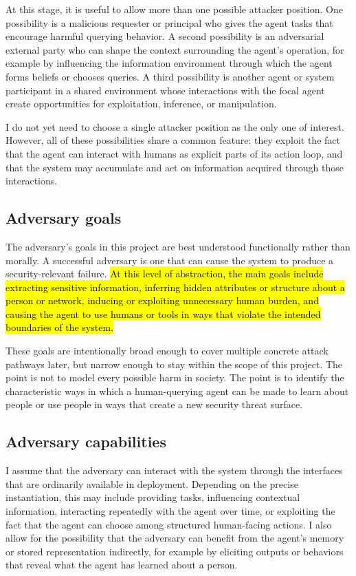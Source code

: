 \documentclass[11pt]{article}
\begin{document}
At this stage, it is useful to allow more than one possible attacker position. One possibility is a malicious requester or principal who gives the agent tasks that encourage harmful querying behavior. A second possibility is an adversarial external party who can shape the context surrounding the agent's operation, for example by influencing the information environment through which the agent forms beliefs or chooses queries. A third possibility is another agent or system participant in a shared environment whose interactions with the focal agent create opportunities for exploitation, inference, or manipulation.

I do not yet need to choose a single attacker position as the only one of interest. However, all of these possibilities share a common feature: they exploit the fact that the agent can interact with humans as explicit parts of its action loop, and that the system may accumulate and act on information acquired through those interactions. \citep{franklin2026agenttraps,schroeder2025multiagentsecurity}

\subsection{Adversary goals}

The adversary's goals in this project are best understood functionally rather than morally. A successful adversary is one that can cause the system to produce a security-relevant failure. \hl{At this level of abstraction, the main goals include extracting sensitive information, inferring hidden attributes or structure about a person or network, inducing or exploiting unnecessary human burden, and causing the agent to use humans or tools in ways that violate the intended boundaries of the system.}

These goals are intentionally broad enough to cover multiple concrete attack pathways later, but narrow enough to stay within the scope of this project. The point is not to model every possible harm in society. The point is to identify the characteristic ways in which a human-querying agent can be made to learn about people or use people in ways that create a new security threat surface.

\subsection{Adversary capabilities}

I assume that the adversary can interact with the system through the interfaces that are ordinarily available in deployment. Depending on the precise instantiation, this may include providing tasks, influencing contextual information, interacting repeatedly with the agent over time, or exploiting the fact that the agent can choose among structured human-facing actions. I also allow for the possibility that the adversary can benefit from the agent's memory or stored representation indirectly, for example by eliciting outputs or behaviors that reveal what the agent has learned about a person.
\end{document}
